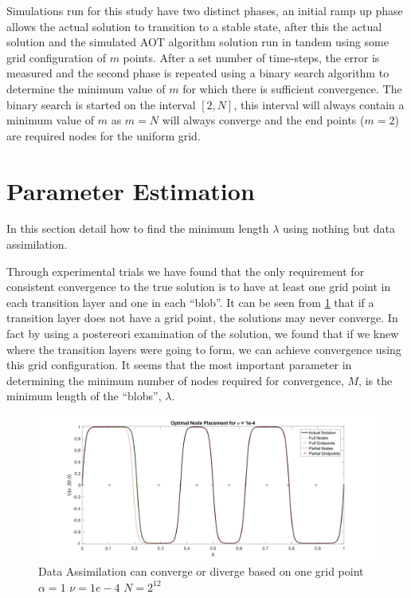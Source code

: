 \documentclass[12pt]{amsart}
\theoremstyle{plain}
\theoremstyle{definition}
\theoremstyle{remark}
\numberwithin{equation}{section} %
\numberwithin{figure}{section}   %
\begin{document}
Simulations run for this study have two distinct phases, an initial ramp up phase allows the actual solution to transition to a stable state, after this the actual solution and the simulated AOT algorithm solution run in tandem using some grid configuration of $m$ points. After a set number of time-steps, the error is measured and the second phase is repeated using a binary search algorithm to determine the minimum value of $m$ for which there is sufficient convergence. The binary search is started on the interval $\left[2,N\right]$, this interval will always contain a minimum value of $m$ as $m=N$ will always converge and the end points ($m=2$) are required nodes for the uniform grid. 
%


\section{Parameter Estimation}\label{secNeat1Section}
\noindent
{}
In this section detail how to find the minimum length $\lambda$ using nothing but data assimilation.

Through experimental trials we have found that the only requirement for consistent convergence to the true solution is to have at least one grid point in each transition layer and one in each ``blob''. It can be seen from \cref{fig:optimal} that if a transition layer does not have a grid point, the solutions may never converge. In fact by using a postereori examination of the solution, we found that if we knew where the transition layers were going to form, we can achieve convergence using this grid configuration. It seems that the most important parameter in determining the minimum number of nodes required for convergence, $M$, is the minimum length of the ``blobs'', $\lambda$. 
\begin{figure}
	\centering
	\includegraphics[scale=0.15]{Optimal.jpg}
	\caption{Data Assimilation can converge or diverge based on one grid point $\alpha = 1$ $\nu=1e-4$ $N = 2^{12}$}
	\label{fig:optimal}
\end{figure}
\end{document}
